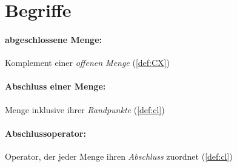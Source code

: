 % 
% 
% 
% 
% 
% 


\section*{Begriffe}

    \paragraph{abgeschlossene Menge:} Komplement einer \textit{offenen Menge} (\ref{def:CX})

    \paragraph{Abschluss einer Menge:} Menge inklusive ihrer \textit{Randpunkte} (\ref{def:cl})

    \paragraph{Abschlussoperator:} Operator, der jeder Menge ihren \textit{Abschluss} zuordnet (\ref{def:cl})
    
